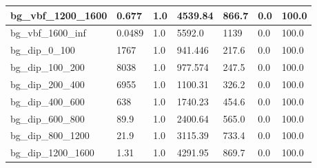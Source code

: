 \documentclass[a4paper, 10pt]{article}
\begin{document}
\begin{table}[H]
\begin{center}
\begin{tabular}{|m{23.0mm}|m{23.0mm}|m{18.0mm}|m{19.0mm}|m{19.0mm}|m{19.0mm}|m{19.0mm}|}
      \hline
      {\cellcolor{white}         bg\_vbf\_1200\_1600}& {\cellcolor{white}         0.677}& {\cellcolor{white}         1.0}& {\cellcolor{white}         4539.84}& {\cellcolor{white}         866.7}& {\cellcolor{red}         0.0}& {\cellcolor{red}         100.0}\\
      \hline
      {\cellcolor{white}         bg\_vbf\_1600\_inf}& {\cellcolor{white}         0.0489}& {\cellcolor{white}         1.0}& {\cellcolor{white}         5592.0}& {\cellcolor{white}         1139}& {\cellcolor{red}         0.0}& {\cellcolor{red}         100.0}\\
      \hline
      {\cellcolor{white}         bg\_dip\_0\_100}& {\cellcolor{white}         1767}& {\cellcolor{white}         1.0}& {\cellcolor{white}         941.446}& {\cellcolor{white}         217.6}& {\cellcolor{red}         0.0}& {\cellcolor{red}         100.0}\\
      \hline
      {\cellcolor{white}         bg\_dip\_100\_200}& {\cellcolor{white}         8038}& {\cellcolor{white}         1.0}& {\cellcolor{white}         977.574}& {\cellcolor{white}         247.5}& {\cellcolor{red}         0.0}& {\cellcolor{red}         100.0}\\
      \hline
      {\cellcolor{white}         bg\_dip\_200\_400}& {\cellcolor{white}         6955}& {\cellcolor{white}         1.0}& {\cellcolor{white}         1100.31}& {\cellcolor{white}         326.2}& {\cellcolor{red}         0.0}& {\cellcolor{red}         100.0}\\
      \hline
      {\cellcolor{white}         bg\_dip\_400\_600}& {\cellcolor{white}         638}& {\cellcolor{white}         1.0}& {\cellcolor{white}         1740.23}& {\cellcolor{white}         454.6}& {\cellcolor{red}         0.0}& {\cellcolor{red}         100.0}\\
      \hline
      {\cellcolor{white}         bg\_dip\_600\_800}& {\cellcolor{white}         89.9}& {\cellcolor{white}         1.0}& {\cellcolor{white}         2400.64}& {\cellcolor{white}         565.0}& {\cellcolor{red}         0.0}& {\cellcolor{red}         100.0}\\
      \hline
      {\cellcolor{white}         bg\_dip\_800\_1200}& {\cellcolor{white}         21.9}& {\cellcolor{white}         1.0}& {\cellcolor{white}         3115.39}& {\cellcolor{white}         733.4}& {\cellcolor{red}         0.0}& {\cellcolor{red}         100.0}\\
      \hline
      {\cellcolor{white}         bg\_dip\_1200\_1600}& {\cellcolor{white}         1.31}& {\cellcolor{white}         1.0}& {\cellcolor{white}         4291.95}& {\cellcolor{white}         869.7}& {\cellcolor{red}         0.0}& {\cellcolor{red}         100.0}\\

\end{tabular}
\end{center}
\end{table}
\end{document}
